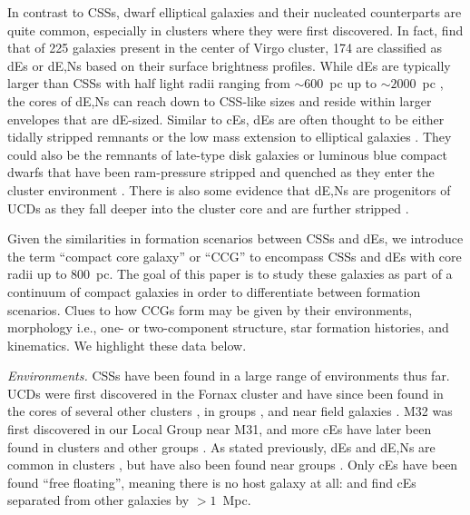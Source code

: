 \documentclass[iop,apj]{emulateapj}
\begin{document}
In contrast to CSSs, dwarf elliptical galaxies \citep[dEs;][]{Sandage1985} and their nucleated counterparts \citep[dE,Ns;][]{Binggeli1984} are quite common, especially in clusters where they were first discovered. In fact, \citet{Binggeli1991} find that of 225 galaxies present in the center of Virgo cluster, 174 are classified as dEs or dE,Ns based on their surface brightness profiles. While dEs are typically larger than CSSs with half light radii ranging from $\sim600$~pc up to $\sim2000$~pc \citep[e.g.,][]{Norris2014}, the cores of dE,Ns can reach down to CSS-like sizes and reside within larger envelopes that are dE-sized. Similar to cEs, dEs are often thought to be either tidally stripped remnants \citep{Crnojevi2014} or the low mass extension to elliptical galaxies \citep{Kormendy2012a}. They could also be the remnants of late-type disk galaxies or luminous blue compact dwarfs that have been ram-pressure stripped and quenched as they enter the cluster environment \citep{Lisker2013, Crawford2016a}. There is also some evidence that dE,Ns are progenitors of UCDs as they fall deeper into the cluster core and are further stripped \citep{Pfeffer2013,Zhang2015,Liu2015}.

Given the similarities in formation scenarios between CSSs and dEs, we introduce the term ``compact core galaxy'' or ``CCG'' to encompass CSSs and dEs with core radii up to 800~pc. The goal of this paper is to study these galaxies as part of a continuum of compact galaxies in order to differentiate between formation scenarios. Clues to how CCGs form may be given by their environments,  morphology i.e., one- or two-component structure, star formation histories, and kinematics. We highlight these data below.

\textit{Environments.} CSSs have been found in a large range of environments thus far. UCDs were first discovered in the Fornax cluster \citep{Hilker1999, Drinkwater2000} and have since been found in the cores of several other clusters \citep{Price2009,Madrid2010,Jones2006,Mieske2009,Misgeld2008}, in groups \citep{Evstigneeva2007}, and near field galaxies \citep{Hau2009,Norris2011}. M32 was first discovered in our Local Group \citep{Faber1973} near M31, and more cEs have later been found in clusters \citep{Chilingarian2007,SmithCastelli2012,Price2009} and other groups \citep{Huxor2011,Chilingarian2010}. As stated previously, dEs and dE,Ns are common in clusters \citep{SmithCastelli2012,Koo1994,Guzman1996,Crawford2016a}, but have also been found near groups \citep{Crnojevi2014,Penny2014}. Only cEs have been found ``free floating'', meaning there is no host galaxy at all: \citet{Huxor2013} and \citet{Paudel2014} find cEs separated from other galaxies by $>1$~Mpc. 
\end{document}
